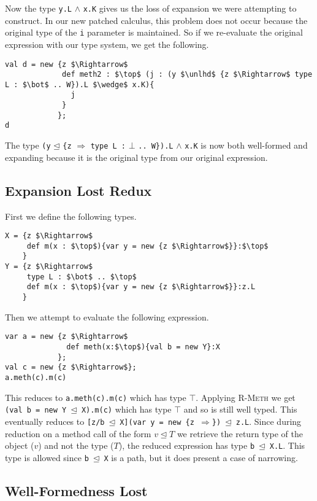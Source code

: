 \documentclass{llncs}
\numberwithin{subcase}{casethm}
\numberwithin{casethm}{theorem}
\numberwithin{casethm}{lemma}
\begin{document}
Now the type \texttt{y.L} $\wedge$ \texttt{x.K} gives us the loss of 
expansion we were attempting to construct. In our new patched calculus, 
this problem does not occur because the original type of the \texttt{i} 
parameter is maintained. So if we re-evaluate the original expression 
with our type system, we get the following.
\begin{lstlisting}[mathescape, style=custom_lang]
val d = new {z $\Rightarrow$
             def meth2 : $\top$ (j : (y $\unlhd$ {z $\Rightarrow$ type L : $\bot$ .. W}).L $\wedge$ x.K){
               j
             }
            };
d
\end{lstlisting}
The type \texttt{(y} $\unlhd$ \texttt{\{z} $\Rightarrow$ 
\texttt{type L :} $\bot$ \texttt{.. W\}).L} $\wedge$ \texttt{x.K} is now 
both well-formed and expanding because it is the original type 
from our original expression.



\subsection{Expansion Lost Redux}
	\label{s:term_mem2}
First we define the following types.
\begin{lstlisting}[mathescape, style=custom_lang]
X = {z $\Rightarrow$
     def m(x : $\top$){var y = new {z $\Rightarrow$}}:$\top$
    }
Y = {z $\Rightarrow$
     type L : $\bot$ .. $\top$
     def m(x : $\top$){var y = new {z $\Rightarrow$}}:z.L
    }
\end{lstlisting}
Then we attempt to evaluate the following expression.
\begin{lstlisting}[mathescape, style=custom_lang]
var a = new {z $\Rightarrow$
              def meth(x:$\top$){val b = new Y}:X
            };
val c = new {z $\Rightarrow$};
a.meth(c).m(c)
\end{lstlisting}
This reduces to \texttt{a.meth(c).m(c)} which has type $\top$. 
Applying \textsc{R-Meth} we get \texttt{(val b = new Y $\unlhd$ X).m(c)}
which has type $\top$ and so is still well typed. This eventually reduces 
to \texttt{[z/b $\unlhd$ X](var y = new \{z $\Rightarrow$\}) $\unlhd$ z.L}.
Since during reduction on a method call of the form $v \unlhd T$
we retrieve the return type of the object ($v$) and 
not the type ($T$), the reduced expression has type \texttt{b $\unlhd$ X.L}. 
This type is allowed since \texttt{b $\unlhd$ X} is a path, but 
it does present a case of narrowing.

\subsection{Well-Formedness Lost}
\end{document}
